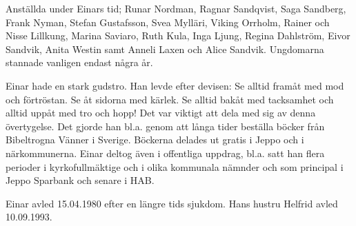 Anställda under Einars tid; Runar Nordman, Ragnar Sandqvist, Saga Sandberg, Frank Nyman, Stefan Gustafsson, Svea Mylläri, Viking Orrholm, Rainer och Nisse Lillkung, Marina Saviaro, Ruth Kula, Inga Ljung, Regina Dahlström, Eivor Sandvik, Anita Westin samt Anneli Laxen och Alice Sandvik.  Ungdomarna stannade vanligen endast några år.

Einar hade en stark gudstro. Han levde efter devisen: Se alltid framåt med mod och förtröstan. Se åt sidorna med kärlek. Se alltid bakåt med tacksamhet och alltid uppåt med tro och hopp! Det var viktigt att dela med sig av denna övertygelse. Det gjorde han bl.a. genom att långa tider beställa böcker från Bibeltrogna Vänner i Sverige. Böckerna delades ut gratis i Jeppo och i närkommunerna. Einar deltog även i offentliga uppdrag, bl.a. satt han flera perioder i kyrkofullmäktige och i olika kommunala nämnder och som principal i Jeppo Sparbank och senare i HAB.

Einar avled 15.04.1980 efter en längre tids sjukdom. Hans hustru Helfrid avled 10.09.1993.



